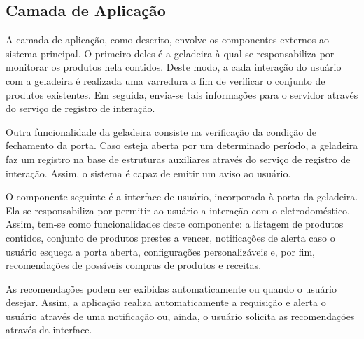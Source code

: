 \subsection{Camada de Aplicação}



A camada de aplicação, como descrito, envolve os componentes externos ao sistema principal. O primeiro deles é a geladeira à qual se  responsabiliza por monitorar os produtos nela contidos. Deste modo, a cada interação do usuário com a geladeira é realizada uma varredura a fim de verificar o conjunto de produtos existentes. Em seguida, envia-se tais informações para o servidor através do serviço de registro de interação.

Outra funcionalidade da geladeira consiste na verificação da condição de fechamento da porta. Caso esteja aberta por um determinado período, a geladeira faz um registro na base de estruturas auxiliares através do serviço de registro de interação. Assim, o sistema é capaz de emitir um aviso ao usuário.


O componente seguinte é a interface de usuário, incorporada à porta da geladeira. Ela se responsabiliza por permitir ao usuário a interação com o eletrodoméstico. Assim, tem-se como funcionalidades deste componente: a listagem de produtos contidos, conjunto de produtos prestes a vencer, notificações de alerta caso o usuário esqueça a porta aberta, configurações personalizáveis e, por fim, recomendações de possíveis compras de produtos e receitas.

As recomendações podem ser exibidas automaticamente ou quando o usuário desejar. Assim, a aplicação realiza automaticamente a requisição e alerta o usuário através de uma notificação ou, ainda, o usuário solicita as recomendações através da interface.





